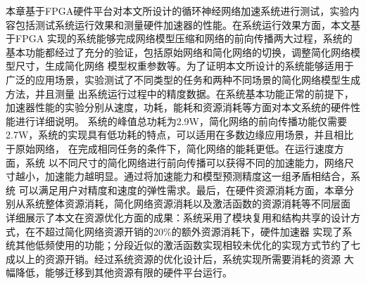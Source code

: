 本章基于FPGA硬件平台对本文所设计的循环神经网络加速系统进行测试，实验内容包括测试系统运行效果和测量硬件加速器的性能。在系统运行效果方面，本文基于FPGA
实现的系统能够完成网络模型压缩和网络的前向传播两大过程，系统的基本功能都经过了充分的验证，包括原始网络和简化网络的切换，调整简化网络模型尺寸，生成简化网络
模型权重参数等。为了证明本文所设计的系统能够适用于广泛的应用场景，实验测试了不同类型的任务和两种不同场景的简化网络模型生成方法，并且测量
出系统运行过程中的精度数据。在系统基本功能正常的前提下，加速器性能的实验分别从速度，功耗，能耗和资源消耗等方面对本文系统的硬件性能进行详细说明。
系统的峰值总功耗为2.9W，简化网络的前向传播功能仅需要2.7W，系统的实现具有低功耗的特点，可以适用在多数边缘应用场景，并且相比于原始网络，
在完成相同任务的条件下，简化网络的能耗更低。在运行速度方面，系统
以不同尺寸的简化网络进行前向传播可以获得不同的加速能力，网络尺寸越小，加速能力越明显。通过将加速能力和模型预测精度这一组矛盾相结合，系统
可以满足用户对精度和速度的弹性需求。最后，在硬件资源消耗方面，本章分别从系统整体资源消耗，简化网络资源消耗以及激活函数的资源消耗等不同层面
详细展示了本文在资源优化方面的成果：系统采用了模块复用和结构共享的设计方式，在不超过简化网络资源开销的20\%的额外资源消耗下，硬件加速器
实现了系统其他低频使用的功能；分段近似的激活函数实现相较未优化的实现方式节约了七成以上的资源开销。经过系统资源的优化设计后，系统实现所需要消耗的资源
大幅降低，能够迁移到其他资源有限的硬件平台运行。







%
